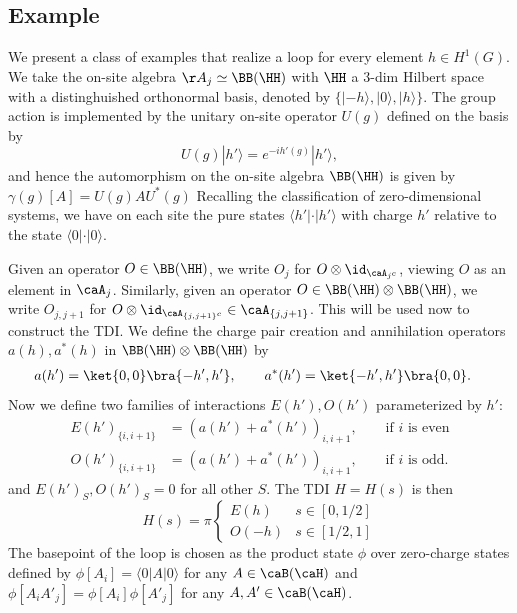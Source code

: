 \subsection{Example}\label{sec: examples}
We present a class of examples that realize a loop for every element $ h \in H^1(G)$.
We take the on-site algebra $\AA_j\simeq \BB(\HH)$ with  $\HH$ a $3$-dim Hilbert space with a distinghuished orthonormal basis, denoted by $\{|-h\rangle,  | 0\rangle,  |h\rangle\}$. The group action is implemented by the unitary on-site operator $U(g)$ defined on the basis by 
\begin{equation}
	U(g) | h'\rangle = e^{-i h'(g)}| h'\rangle,
\end{equation}
and hence the automorphism on the on-site algebra $\BB(\HH)$ is given by $\gamma(g)[A]=U(g)AU^*(g)$
Recalling the classification of zero-dimensional systems, we have on each site the pure states $\langle h'| \cdot |h'\rangle$ with charge $h'$ relative to the state $\langle 0| \cdot |0\rangle$. 

Given an operator $ O \in \BB(\HH)$, we write $O_j$ for $O\otimes \id_{\caA_{j^c}}$, viewing $O$ as an element in $\caA_j$. Similarly, given an operator $O \in \BB(\HH) \otimes \BB(\HH) $, we write $O_{j,j+1}$ for $O\otimes \id_{\caA_{\{j,j+1\}^c}}\in\caA_{ \{j,j+1\}  }$. This will be used now to construct the TDI.
We define the charge pair creation and annihilation operators $a(h),a^*(h)$ in $\BB(\HH) \otimes \BB(\HH) $ by 
\begin{align}
	a(h')=\ket{0,0}\bra{-h',h'},\qquad  	a^*(h')&=\ket{-h',h'}\bra{0,0}.
\end{align}
Now we define two families of interactions $E(h'),O(h')$ parameterized by $h'$:
\begin{align}
	E(h')_{\{i,i+1 \}} & =  (a(h')+a^*(h'))_{i,i+1},\qquad \text{if $i$ is even}     \\
	O(h')_{\{i,i+1 \}} & = (a(h')+a^*(h'))_{i,i+1},\qquad \text{if $i$ is odd}  .
\end{align}
and $E(h')_S,O(h')_S=0$ for all other $S$. 
The TDI  $H=H(s)$ is then 
\begin{equation}
	H(s)= 	\pi \begin{cases}
		E(h)& s\in[0,1/2]\\
		O(-h)&s \in[1/2,1]
	\end{cases}
\end{equation}
The basepoint of the loop is chosen as the product state $\phi$ over zero-charge states defined by $\phi[A_{i}]  = \langle 0| A |0\rangle$ for any $A \in \caB(\caH)$ and $\phi[A_{i}A'_{j}] =  \phi[A_{i}]  \phi[A'_{j}]$ for any $A,A' \in \caB(\caH)$.

